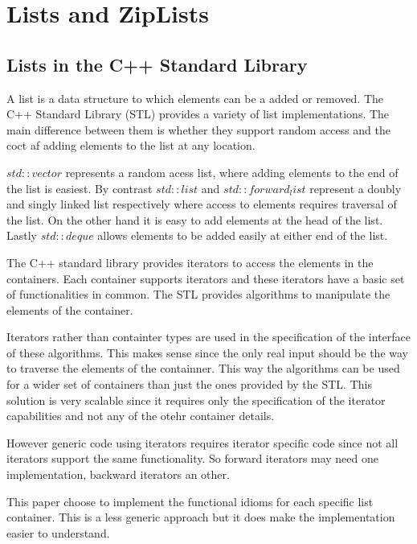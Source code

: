 \documentclass[12pt,fleqn]{article}
\begin{document}
\section{Lists and ZipLists}
%
%
%


\subsection{Lists in the C++ Standard Library}
%
%
%

A list is a data structure to which elements can be a added or removed.
The C++ Standard Library (STL) provides a variety of list implementations.
The main difference between them is whether they support random access and the coct af adding elements to the list at any location.

$std::vector$ represents a random acess list,  where adding elements to the end of the list is easiest.
By contrast $std::list$ and $std::forward_list$ represent a doubly and singly linked list respectively where access to elements requires traversal of the list.
On the other hand it is easy to add elements at the head of the list.
Lastly $std::deque$ allows elements to be added easily at either end of the list.

The C++ standard library provides iterators to access the elements in the containers.
Each container supports iterators and these iterators have a basic set of functionalities in common.
The STL provides algorithms to manipulate the elements of the container.

Iterators rather than containter types are used in the specification of the interface of these algorithms.
This makes sense since the only real input should be the way to traverse the elements of the containner.
This way the algorithms can be used for a wider set of containers than just the ones provided by the STL.
This solution is very scalable since it requires only the specification of the iterator capabilities and not any of the otehr container details.

However generic code using iterators requires iterator specific code since not all iterators support the same functionality.
So forward iterators may need one implementation, backward iterators an other.

This paper choose to implement the functional idioms for each specific list container.
This is a less generic approach but it does make the implementation easier to understand.
\end{document}
